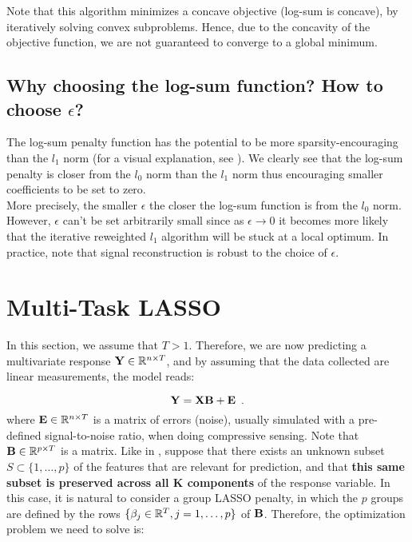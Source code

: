 \documentclass[a4paper,10pt]{article}
\theoremstyle{definition}
\begin{document}
\vskip 0.2in

Note that this algorithm minimizes a concave objective (log-sum is concave), by iteratively solving convex subproblems. Hence, due to the concavity of the objective function, we
are not guaranteed to converge to a global minimum.

\subsection*{Why choosing the log-sum function? How to choose $\epsilon$?}

The log-sum penalty function has the potential to be more sparsity-encouraging than the $l_1$ norm (for a visual explanation, see \cite{Candes_Wakin_Boyd08}). We clearly see
that the log-sum penalty is closer from the $l_0$ norm than the $l_1$ norm thus encouraging smaller coefficients to be set to zero.
\\
More precisely, the smaller $\epsilon$ the closer the log-sum function is from the $l_0$ norm. However, $\epsilon$ can't be set arbitrarily small since as $\epsilon \rightarrow 0$ it
becomes more likely that the iterative reweighted $l_1$ algorithm will be stuck at a local optimum. In practice, note that signal reconstruction is robust to the choice of $\epsilon$.

\section{Multi-Task LASSO}
\label{section_4}

In this section, we assume that $T > 1$. Therefore, we are now predicting a multivariate response $\mathbf{Y}\in \mathbb{R}^{n \times T}$, and by assuming that the data collected are linear measurements, the model reads:

\begin{equation*}
    \bf Y = XB + E
    \enspace .
\end{equation*}
%
where $\mathbf{E} \in \mathbb{R}^{n \times T}$ is a matrix of errors (noise), usually simulated with a pre-defined signal-to-noise ratio, when doing compressive sensing. Note that $\mathbf{B} \in \mathbb{R}^{p \times T}$ is a matrix.
Like in , suppose that there exists an unknown subset $S \subset  \{1, \dots, p\}$ of the features that are relevant for prediction, and that \textbf{this same subset is preserved across all K components} of the response
variable. In this case, it is natural to consider a group LASSO penalty, in which the $p$ groups are defined by the rows $\{\beta_{j} \in \mathbb{R}^T, j=1,\dots,p\}$ of $\bf B$.
Therefore, the optimization problem we need to solve is:
\end{document}
